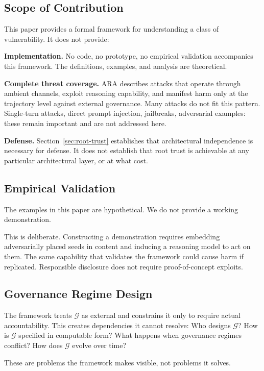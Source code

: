 \documentclass[11pt]{article}
\theoremstyle{definition}
\theoremstyle{plain}
\theoremstyle{remark}
\newcommand{\G}{\mathcal{G}}
\begin{document}
\subsection{Scope of Contribution}

This paper provides a formal framework for understanding a class of vulnerability. It does not provide:

\textbf{Implementation.} No code, no prototype, no empirical validation accompanies this framework. The definitions, examples, and analysis are theoretical.

\textbf{Complete threat coverage.} ARA describes attacks that operate through ambient channels, exploit reasoning capability, and manifest harm only at the trajectory level against external governance. Many attacks do not fit this pattern. Single-turn attacks, direct prompt injection, jailbreaks, adversarial examples: these remain important and are not addressed here.

\textbf{Defense.} Section~\ref{sec:root-trust} establishes that architectural independence is necessary for defense. It does not establish that root trust is achievable at any particular architectural layer, or at what cost.

\subsection{Empirical Validation}

The examples in this paper are hypothetical. We do not provide a working demonstration.

This is deliberate. Constructing a demonstration requires embedding adversarially placed seeds in content and inducing a reasoning model to act on them. The same capability that validates the framework could cause harm if replicated. Responsible disclosure does not require proof-of-concept exploits.

\subsection{Governance Regime Design}

The framework treats $\G$ as external and constrains it only to require actual accountability. This creates dependencies it cannot resolve: Who designs $\G$? How is $\G$ specified in computable form? What happens when governance regimes conflict? How does $\G$ evolve over time?

These are problems the framework makes visible, not problems it solves.
\end{document}
